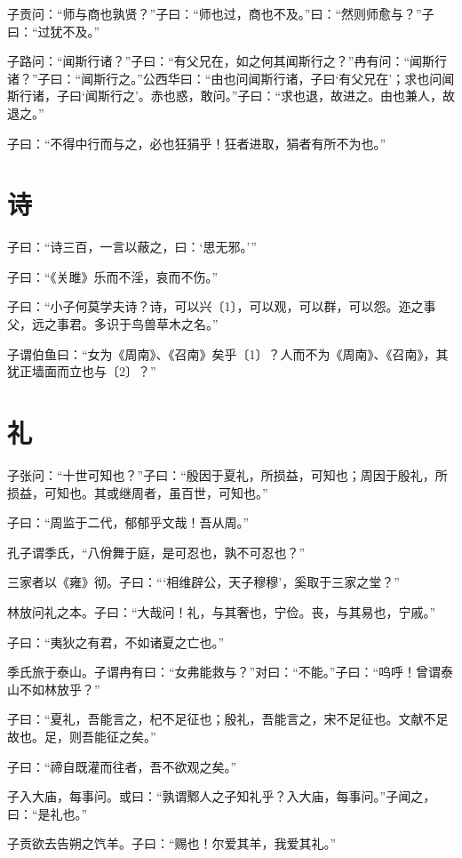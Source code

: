 \documentclass[a5paper]{ctexbook}
\begin{document}
    子贡问：“师与商也孰贤？”子曰：“师也过，商也不及。”曰：“然则师愈与？”子曰：“过犹不及。”

    子路问：“闻斯行诸？”子曰：“有父兄在，如之何其闻斯行之？”冉有问：“闻斯行诸？”子曰：“闻斯行之。”公西华曰：“由也问闻斯行诸，子曰‘有父兄在’；求也问闻斯行诸，子曰‘闻斯行之’。赤也惑，敢问。”子曰：“求也退，故进之。由也兼人，故退之。”

    子曰：“不得中行而与之，必也狂狷乎！狂者进取，狷者有所不为也。”

    \chapter{诗}

    子曰：“诗三百，一言以蔽之，曰：‘思无邪。’”

    子曰：“《关雎》乐而不淫，哀而不伤。”

    子曰：“小子何莫学夫诗？诗，可以兴〔1〕，可以观，可以群，可以怨。迩之事父，远之事君。多识于鸟兽草木之名。”

    子谓伯鱼曰：“女为《周南》、《召南》矣乎〔1〕？人而不为《周南》、《召南》，其犹正墙面而立也与〔2〕？”

    \chapter{礼}

    子张问：“十世可知也？”子曰：“殷因于夏礼，所损益，可知也；周因于殷礼，所损益，可知也。其或继周者，虽百世，可知也。”

    子曰：“周监于二代，郁郁乎文哉！吾从周。”

    孔子谓季氏，“八佾舞于庭，是可忍也，孰不可忍也？”

    三家者以《雍》彻。子曰：“‘相维辟公，天子穆穆’，奚取于三家之堂？”

    林放问礼之本。子曰：“大哉问！礼，与其奢也，宁俭。丧，与其易也，宁戚。”

    子曰：“夷狄之有君，不如诸夏之亡也。”

    季氏旅于泰山。子谓冉有曰：“女弗能救与？”对曰：“不能。”子曰：“呜呼！曾谓泰山不如林放乎？”

    子曰：“夏礼，吾能言之，杞不足征也；殷礼，吾能言之，宋不足征也。文献不足故也。足，则吾能征之矣。”

    子曰：“禘自既灌而往者，吾不欲观之矣。”

    子入大庙，每事问。或曰：“孰谓鄹人之子知礼乎？入大庙，每事问。”子闻之，曰：“是礼也。”

    子贡欲去告朔之饩羊。子曰：“赐也！尔爱其羊，我爱其礼。”
\end{document}
